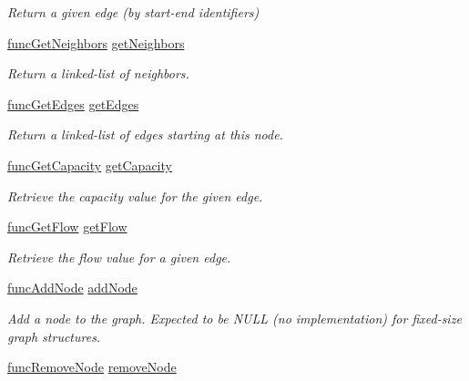 \begin{DoxyCompactItemize}
\begin{DoxyCompactList}\small\item\em Return a given edge (by start-\/end identifiers) \end{DoxyCompactList}\item 
\hyperlink{graphops_8h_aaa1468312d0d9fb546507a624821f412}{func\+Get\+Neighbors} \hyperlink{structgraphops__t_ac6c5bec2f102e4da5959cc3db66ac3c6}{get\+Neighbors}
\begin{DoxyCompactList}\small\item\em Return a linked-\/list of neighbors. \end{DoxyCompactList}\item 
\hyperlink{graphops_8h_a1cf1c55a55049fff31b8097bfd289a62}{func\+Get\+Edges} \hyperlink{structgraphops__t_a87fec7e1150c05e54e34ab09fe401eaa}{get\+Edges}
\begin{DoxyCompactList}\small\item\em Return a linked-\/list of edges starting at this node. \end{DoxyCompactList}\item 
\hyperlink{graphops_8h_a0641347fdbb9412ba9ccef3a27da914c}{func\+Get\+Capacity} \hyperlink{structgraphops__t_a2c16b33828f7304837b679fcf2ead523}{get\+Capacity}
\begin{DoxyCompactList}\small\item\em Retrieve the capacity value for the given edge. \end{DoxyCompactList}\item 
\hyperlink{graphops_8h_a9294a965d66cd4a4d39e0b388edeff1d}{func\+Get\+Flow} \hyperlink{structgraphops__t_adda43f12be5d13e127c0fa79454dd92f}{get\+Flow}
\begin{DoxyCompactList}\small\item\em Retrieve the flow value for a given edge. \end{DoxyCompactList}\item 
\hyperlink{graphops_8h_a1fa386709ec061d33a9b473357ac1f48}{func\+Add\+Node} \hyperlink{structgraphops__t_aa1fdab76a86ab2889415964b51f1738f}{add\+Node}
\begin{DoxyCompactList}\small\item\em Add a node to the graph. Expected to be N\+U\+LL (no implementation) for fixed-\/size graph structures. \end{DoxyCompactList}\item 
\hyperlink{graphops_8h_af899b37f71f9610e62b98e13212d59da}{func\+Remove\+Node} \hyperlink{structgraphops__t_a6f3cb37e537a56ef77622056d7b409d3}{remove\+Node}

\end{DoxyCompactItemize}
